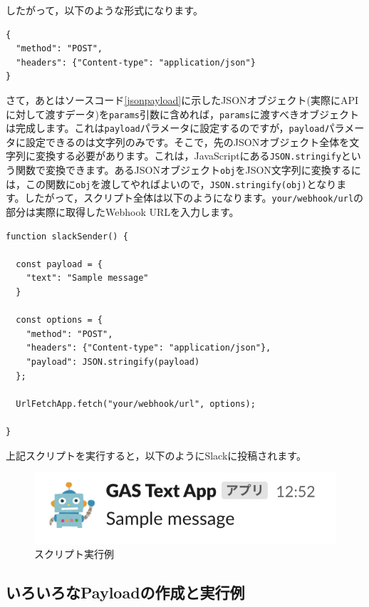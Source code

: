 \documentclass[uplatex,a4j]{jsarticle}
\begin{document}
したがって，以下のような形式になります。

\begin{lstlisting}[basicstyle=\ttfamily\footnotesize,frame=single,caption=params argument for UrlFetchApp]
{
  "method": "POST",
  "headers": {"Content-type": "application/json"}
}
\end{lstlisting}

さて，あとはソースコード\ref{jsonpayload}に示したJSONオブジェクト(実際にAPIに対して渡すデータ)を\verb|params|引数に含めれば，\verb|params|に渡すべきオブジェクトは完成します。これは\verb|payload|パラメータに設定するのですが，\verb|payload|パラメータに設定できるのは文字列のみです。そこで，先のJSONオブジェクト全体を文字列に変換する必要があります。これは，JavaScriptにある\verb|JSON.stringify|という関数で変換できます。あるJSONオブジェクト\verb|obj|をJSON文字列に変換するには，この関数に\verb|obj|を渡してやればよいので，\verb|JSON.stringify(obj)|となります。したがって，スクリプト全体は以下のようになります。\verb|your/webhook/url|の部分は実際に取得したWebhook URLを入力します。

\begin{lstlisting}[basicstyle=\ttfamily\footnotesize,frame=single,caption=Incoming Webhook Sample]
function slackSender() {
  
  const payload = {
    "text": "Sample message"
  }
  
  const options = {
    "method": "POST",
    "headers": {"Content-type": "application/json"},
    "payload": JSON.stringify(payload)
  };
        
  UrlFetchApp.fetch("your/webhook/url", options);
  
}
\end{lstlisting}

上記スクリプトを実行すると，以下のようにSlackに投稿されます。

\begin{figure}[H]
 \centering
 \includegraphics[keepaspectratio, scale=1.0]{images/standalone_gas3.png}
 \caption{スクリプト実行例}
 \label{fig:standalone_gas3}
\end{figure}


\subsection{いろいろなPayloadの作成と実行例}
\end{document}
